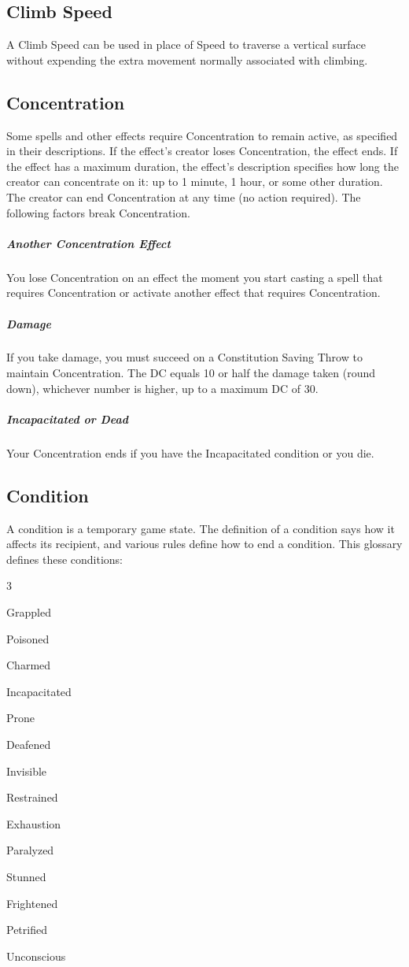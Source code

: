 \documentclass[10pt,a4paper,twoside,bg=print,twocolumn,openany,nodeprecatedcode]{dndarticle}
\begin{document}
\subsection{Climb Speed}
A Climb Speed can be used in place of Speed to traverse a vertical surface without expending the extra movement normally associated with climbing.

\subsection{Concentration}
Some spells and other effects require Concentration to remain active, as specified in their descriptions. If the effect's creator loses Concentration, the effect ends. If the effect has a maximum duration, the effect's description specifies how long the creator can concentrate on it: up to 1 minute, 1 hour, or some other duration. The creator can end Concentration at any time (no action required). The following factors break Concentration.

\subparagraph{Another Concentration Effect}
You lose Concentration on an effect the moment you start casting a spell that requires Concentration or activate another effect that requires Concentration.

\subparagraph{Damage}
If you take damage, you must succeed on a Constitution Saving Throw to maintain Concentration. The DC equals 10 or half the damage taken (round down), whichever number is higher, up to a maximum DC of 30.

\subparagraph{Incapacitated or Dead}
Your Concentration ends if you have the Incapacitated condition or you die.

\subsection{Condition}
A condition is a temporary game state. The definition of a condition says how it affects its recipient, and various rules define how to end a condition. This glossary defines these conditions:


\begin{description}
\dndsans
\begin{multicols}{3}
\item Grappled
\item Poisoned
\item Charmed
\item Incapacitated
\item Prone
\item Deafened
\item Invisible
\item Restrained
\item Exhaustion
\item Paralyzed
\item Stunned
\item Frightened
\item Petrified
\item Unconscious
\end{multicols}

\end{description}
\end{document}
